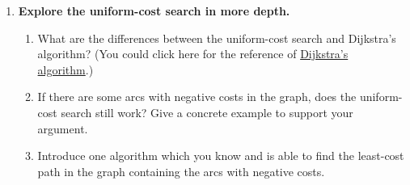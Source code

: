 \documentclass{article}
\begin{document}
\begin{enumerate}
\clearpage
\item \textbf{Explore the uniform-cost search in more depth.}
\begin{enumerate}
    \item What are the differences between the uniform-cost search and Dijkstra's algorithm? (You could click here for the reference of \href{https://en.wikipedia.org/wiki/Dijkstra%27s_algorithm}{Dijkstra's algorithm}.)
    \item If there are some arcs with negative costs in the graph, does the uniform-cost search still work? Give a concrete example to support your argument.
    \item Introduce one  algorithm which you know and is able to find the least-cost path in the graph containing the arcs with negative costs.
\end{enumerate}
\end{enumerate}
\end{document}
